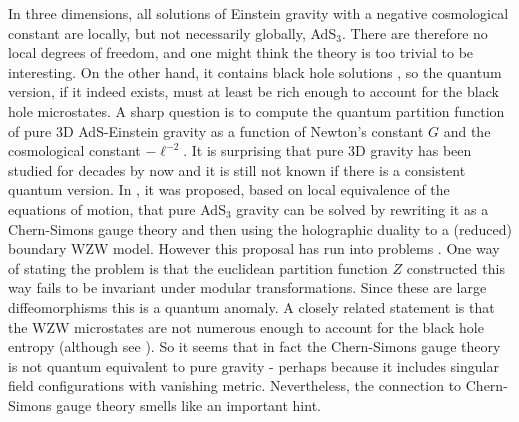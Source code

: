   In three dimensions, all solutions of Einstein gravity with a negative cosmological constant are locally, but not necessarily globally, AdS$_3$. There are therefore no local degrees of freedom, and one might think the theory is too trivial to be interesting. On the other hand, it contains black hole solutions \btz, so the quantum version, if it indeed exists,  must at least be rich enough to account for the black hole microstates.  A sharp question is to compute the quantum partition function of pure 3D AdS-Einstein gravity as a function of Newton's constant $G$ and the cosmological constant $-\ell^{-2}$. It is surprising that pure 3D gravity has been studied for  decades by now and it is still not known if there is a consistent quantum version. 
    In \witcsg, it was proposed, based on local equivalence of the equations of motion, that  pure AdS$_3$ gravity can be solved by rewriting it as  a Chern-Simons gauge theory and then using the holographic duality to a (reduced) boundary WZW model. However this proposal has run into problems \witrec .
 One way of stating the problem is that the euclidean partition function $Z$ constructed this way fails to be invariant under modular transformations. Since these are large diffeomorphisms this is a quantum  anomaly. A closely related statement is that the WZW microstates are not numerous enough to account for the black hole entropy (although see \fjrl). So it seems that in fact the Chern-Simons gauge theory is not quantum equivalent to pure gravity - perhaps because it includes singular field configurations with vanishing metric. Nevertheless, the connection  to Chern-Simons gauge theory smells like an important hint.

